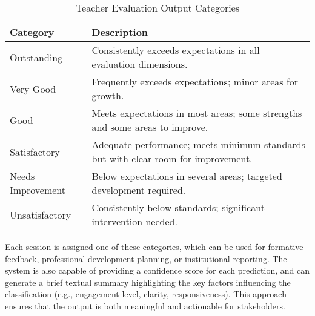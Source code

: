 \begin{table}[H]
    \centering
    \normalsize
    \caption{Teacher Evaluation Output Categories}
    \label{tab:output_categories}
    \begin{tabular}{p{2.2cm} p{7.1cm}}
        \toprule
        \textbf{Category} & \textbf{Description} \\
        \midrule
        Outstanding & Consistently exceeds expectations in all evaluation dimensions. \\
        Very Good & Frequently exceeds expectations; minor areas for growth. \\
        Good & Meets expectations in most areas; some strengths and some areas to improve. \\
        Satisfactory & Adequate performance; meets minimum standards but with clear room for improvement. \\
        Needs Improvement & Below expectations in several areas; targeted development required. \\
        Unsatisfactory & Consistently below standards; significant intervention needed. \\
        \bottomrule
    \end{tabular}
\end{table}

Each session is assigned one of these categories, which can be used for formative feedback, professional development planning, or institutional reporting. The system is also capable of providing a confidence score for each prediction, and can generate a brief textual summary highlighting the key factors influencing the classification (e.g., engagement level, clarity, responsiveness). This approach ensures that the output is both meaningful and actionable for stakeholders.

